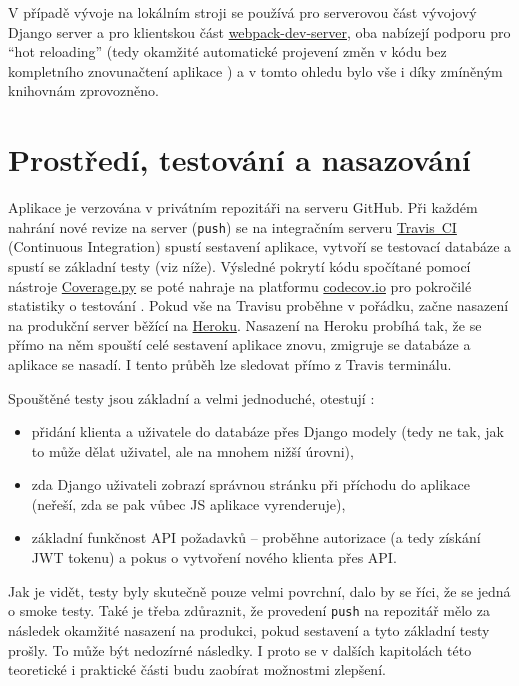 V případě vývoje na lokálním stroji se používá \cite{bp} pro serverovou část vývojový Django server a pro klientskou část \href{https://github.com/webpack/webpack-dev-server}{webpack-dev-server}, oba nabízejí podporu pro \enquote{hot reloading} (tedy okamžité automatické projevení změn v kódu bez kompletního znovunačtení aplikace \cite{webpack-docs-hmr}) a v tomto ohledu bylo vše i díky zmíněným knihovnám zprovozněno.

\section{Prostředí, testování a nasazování}\label{sec:prostreditestovaninasazovani}

Aplikace \cite{bp} je verzována v privátním repozitáři na serveru GitHub. Při každém nahrání nové revize na server (\verb|push|) se na integračním serveru \href{https://travis-ci.com/}{Travis~CI} (Continuous Integration) spustí sestavení aplikace, vytvoří se testovací databáze a spustí se základní testy (viz níže). Výsledné pokrytí kódu spočítané pomocí nástroje \href{https://coverage.readthedocs.io/}{Coverage.py} se poté nahraje na platformu \href{https://codecov.io/}{codecov.io} pro pokročilé statistiky o testování \cite{codecov}. Pokud vše na Travisu proběhne v pořádku, začne nasazení na produkční server běžící na \href{https://www.heroku.com/}{Heroku}. Nasazení na Heroku probíhá tak, že se přímo na něm spouští celé sestavení aplikace znovu, zmigruje se databáze a aplikace se nasadí. I tento průběh lze sledovat přímo z Travis terminálu.

Spouštěné testy jsou základní a velmi jednoduché, otestují \cite{bp}:
\begin{itemize}
    \item přidání klienta a uživatele do databáze přes Django modely (tedy ne tak, jak to může dělat uživatel, ale na mnohem nižší úrovni),
    \item zda Django uživateli zobrazí správnou stránku při příchodu do aplikace (neřeší, zda se pak vůbec JS aplikace vyrenderuje),
    \item základní funkčnost API požadavků -- proběhne autorizace (a tedy získání JWT tokenu) a pokus o vytvoření nového klienta přes API.
\end{itemize}

Jak je vidět, testy byly skutečně pouze velmi povrchní, dalo by se říci, že se jedná o smoke testy. Také je třeba zdůraznit, že provedení \verb|push| na repozitář mělo za následek okamžité nasazení na produkci, pokud sestavení a tyto základní testy prošly. To může být nedozírné následky. I proto se v dalších kapitolách této teoretické i praktické části budu zaobírat možnostmi zlepšení.

